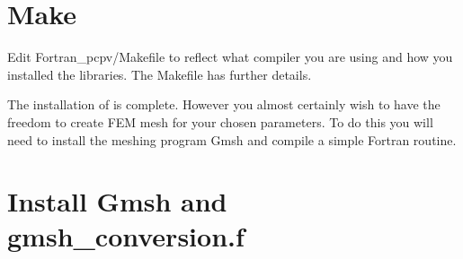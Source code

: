 \documentclass[11pt,a4paper,twoside]{report}
\begin{document}
\section{Make \CodeName}

Edit Fortran\_pcpv/Makefile to reflect what compiler you are using and how you installed the libraries.
The Makefile has further details.




The installation of \CodeName is complete.
However you almost certainly wish to have the freedom to create FEM mesh for your chosen parameters. To do this you will need to install the meshing program Gmsh and compile a simple Fortran routine.




\section{Install Gmsh and gmsh\_conversion.f}
\end{document}
